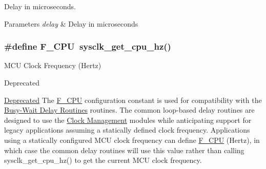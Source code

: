 Delay in microseconds. 


\begin{DoxyParams}{Parameters}
{\em delay} & Delay in microseconds \\
\hline
\end{DoxyParams}
\hypertarget{group__group__common__services__delay_ga43bafb28b29491ec7f871319b5a3b2f8}{
\subsubsection[{F\-\_\-\-C\-P\-U}]{\setlength{\rightskip}{0pt plus 5cm}\#define F\-\_\-\-C\-P\-U~sysclk\-\_\-get\-\_\-cpu\-\_\-hz()}}\label{group__group__common__services__delay_ga43bafb28b29491ec7f871319b5a3b2f8}


M\-C\-U Clock Frequency (Hertz) 

\begin{DoxyRefDesc}{Deprecated}
\item[\hyperlink{deprecated__deprecated000001}{Deprecated}]The \hyperlink{group__group__common__services__delay_ga43bafb28b29491ec7f871319b5a3b2f8}{F\-\_\-\-C\-P\-U} configuration constant is used for compatibility with the \hyperlink{group__group__common__services__delay}{Busy-\/\-Wait Delay Routines} routines. The common loop-\/based delay routines are designed to use the \hyperlink{group__clk__group}{Clock Management} modules while anticipating support for legacy applications assuming a statically defined clock frequency. Applications using a statically configured M\-C\-U clock frequency can define \hyperlink{group__group__common__services__delay_ga43bafb28b29491ec7f871319b5a3b2f8}{F\-\_\-\-C\-P\-U} (Hertz), in which case the common delay routines will use this value rather than calling sysclk\-\_\-get\-\_\-cpu\-\_\-hz() to get the current M\-C\-U clock frequency. \end{DoxyRefDesc}
